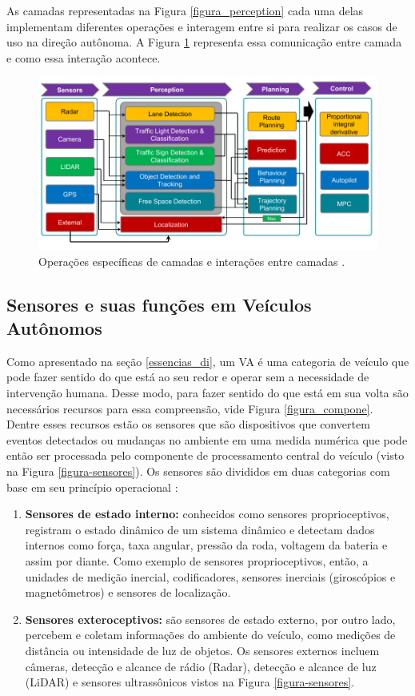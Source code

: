 As camadas representadas na Figura \ref{figura_perception} cada uma delas implementam diferentes operações e interagem entre si para realizar os casos de uso na direção autônoma. A Figura \ref{figura_camadas} representa essa comunicação entre camada e como essa interação acontece.
\begin{figure}[H]
\centering
\includegraphics[width=\textwidth]{Figures/layer-sens.png}
\caption{Operações específicas de camadas e interações entre camadas \cite{sensors-yet}.}
\label{figura_camadas}
\end{figure}

\subsection{Sensores e suas funções em Veículos Autônomos} \label{sensores-a}

Como apresentado na seção \ref{essencias_di}, um VA é uma categoria de veículo que pode fazer sentido do que está ao seu redor e operar sem a necessidade de intervenção humana. Desse modo, para fazer sentido do que está em sua volta são necessários recursos para essa compreensão, vide Figura \ref{figura_compone}. Dentre esses recursos estão os sensores que são dispositivos que convertem eventos detectados ou mudanças no ambiente em uma medida numérica que pode então ser processada pelo componente de processamento central do veículo (visto na Figura \ref{figura-sensores}). 
Os sensores são divididos em duas categorias com base em seu princípio operacional \cite{sensors}:  
\begin{enumerate}
 \item \textbf{Sensores de estado interno:} conhecidos como sensores proprioceptivos, registram o estado dinâmico de um sistema dinâmico e detectam dados internos como força, taxa angular, pressão da roda, voltagem da bateria e assim por diante. Como exemplo de sensores proprioceptivos, então, a unidades de medição inercial, codificadores, sensores inerciais (giroscópios e magnetômetros) e sensores de localização. 
\item \textbf{Sensores exteroceptivos:} são sensores de estado externo, por outro lado, percebem e coletam informações do ambiente do veículo, como medições de distância ou intensidade de luz de objetos. Os sensores externos incluem câmeras, detecção e alcance de rádio (Radar), detecção e alcance de luz (LiDAR) e sensores ultrassônicos vistos na Figura \ref{figura-sensores}.
\end{enumerate}

